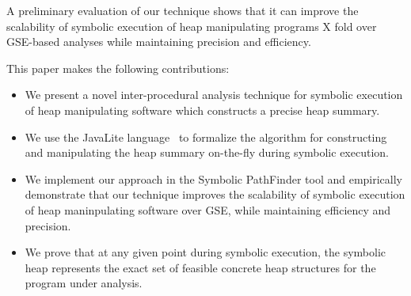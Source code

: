   A preliminary evaluation of our technique
shows that it can improve the scalability of symbolic execution
of heap manipulating programs X fold over GSE-based analyses
while maintaining precision and efficiency. 

This paper makes the following contributions:
\begin{itemize}
\item{We present a novel inter-procedural analysis technique for 
symbolic execution of heap manipulating software which constructs 
a precise heap summary.}
\item{We use the JavaLite language~\cite{saints-MS} to formalize 
the algorithm for constructing and manipulating the heap summary
on-the-fly during symbolic execution.}
\item{We implement our approach in the Symbolic PathFinder tool and
empirically demonstrate that our technique improves
the scalability of symbolic execution of heap maninpulating software
over GSE, while maintaining efficiency and precision.}
\item{We prove that at any given point during symbolic execution, the symbolic 
heap represents the exact set of feasible concrete heap structures 
for the program under analysis.}
 \end{itemize}

  



